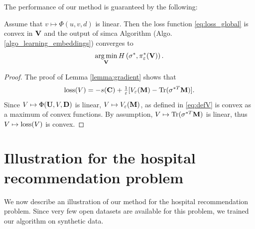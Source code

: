 The performance of our method is guaranteed by the following:
\begin{lemma}\label{lemma:convergence_guarantee} Assume that $v \mapsto
        \Phi(u,v,d)$ is linear. Then the loss function \eqref{eq:loss_global} is convex
    in $\mathbf{V}$ and the output of \ac{simca} Algorithm (Algo.
    \ref{algo_learning_embeddings}) converges to
    \begin{equation*}
        \operatorname*{arg\,min}_{\mathbf{V}} H\left(\sigma^*,\pi^*_{\varepsilon}(\mathbf{V})\right).
    \end{equation*}
\end{lemma}

\begin{proof}
    The proof of Lemma \ref{lemma:gradient} shows that
    \begin{equation*}
        \mathrm{loss}(V) = -s(\mathbf{C}) + \tfrac{1}{\varepsilon} [
            V_\varepsilon(\mathbf{M}) - {\rm Tr}(\sigma^{*T}\mathbf{M})].
    \end{equation*}
    Since $V \mapsto \Phi(\mathbf{U},V,\mathbf{D})$ is linear, $V \mapsto V_\varepsilon(\mathbf{M})$, as defined
    in \eqref{eq:defV} is convex as a maximum of convex functions. By assumption, $V
        \mapsto {\rm Tr}(\sigma^{*T}\mathbf{M})$ is linear, thus $V \mapsto \mathrm{loss}(V)$ is convex.
\end{proof}

\section{Illustration for the hospital recommendation problem}
We now describe an illustration of our method for the hospital recommendation
problem. Since very few open datasets are available for this problem, we trained
our algorithm on synthetic data.

